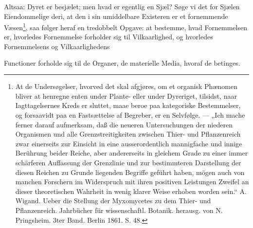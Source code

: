 \documentclass[12pt,a4paper]{book}
\begin{document}
Altsaa: Dyret er besjælet; men hvad er egentlig en Sjæl? Søge vi det for Sjælen
Eiendommelige deri, at den i sin umiddelbare Existeren er et fornemmende
Væsen\footnote{At de Undersøgelser, hvorved det skal afgjøres, om et organisk
Phænomen bliver at henregne enten under Plante- eller under Dyreriget,
tilsidst, naar Iagttagelsernes Kreds er sluttet, maae beroe paa kategoriske
Bestemmelser, og forsaavidt paa en Fastsættelse af Begreber, er en Selvfølge.
--- „Ich mache ferner darauf aufmerksam, daß die neueren Untersuchungen der
niederen Organismen und alle Grenzstreitigkeiten zwischen Thier- und
Pflanzenreich zwar einerseits zur Einsicht in eine ausserordentlich mannigfache
und innige Berührung beider Reiche, aber andererseits in gleichem Grade zu
einer immer schärferen Auffassung der Grenzlinie und zur bestimmteren
Darstellung der diesen Reichen zu Grunde liegenden Begriffe geführt haben,
mögen auch von manchen Forschern im Widerspruch mit ihren positiven Leistungen
Zweifel an dieser theoretischen Wahrheit in wenig klarer Weise erhoben worden
sein.“ A. Wigand. Ueber die Stellung der Myxomycetes zu dem Thier- und
Pflanzenreich. Jahrbücher für wissenschaftl. Botanik. herausg. von
N. Pringsheim. 3ter Band. Berlin 1861. S. 48.}, saa følger heraf en tredobbelt
Opgave: at bestemme, hvad Fornemmelsen er, hvorledes Fornemmelse forholder sig
til Vilkaarlighed, og hvorledes Fornemmelsens og Vilkaarlighedens

\setcounter{footnote}{0}
Functioner forholde sig til de Organer, de materielle Media, hvoraf de
betinges.
\end{document}
